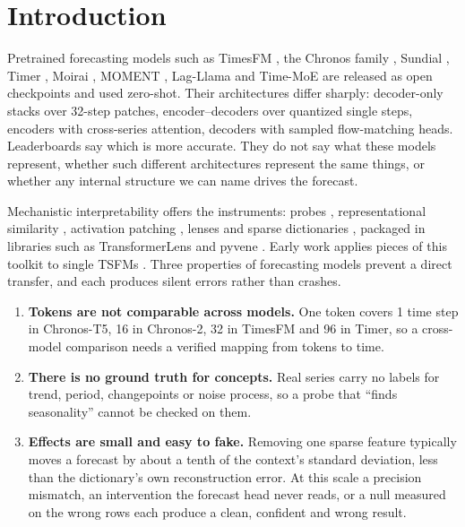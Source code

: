 \section{Introduction}
\label{sec:intro}

Pretrained forecasting models such as TimesFM \citep{das2024timesfm}, the Chronos family
\citep{ansari2024chronos,ansari2025chronos2}, Sundial \citep{liu2025sundial}, Timer \citep{liu2024timer}, Moirai
\citep{woo2024moirai}, MOMENT \citep{goswami2024moment}, Lag-Llama \citep{rasul2023lagllama} and Time-MoE
\citep{shi2025timemoe} are released as open checkpoints and used zero-shot. Their architectures differ sharply:
decoder-only stacks over 32-step patches, encoder--decoders over quantized single steps, encoders with cross-series
attention, decoders with sampled flow-matching heads. Leaderboards say which is more accurate. They do not say what these
models represent, whether such different architectures represent the same things, or whether any internal structure we
can name drives the forecast.

Mechanistic interpretability offers the instruments: probes \citep{alain2017probes,hewitt2019control},
representational similarity \citep{kornblith2019cka}, activation patching \citep{vig2020causal,meng2022rome,zhang2024patching},
lenses \citep{belrose2023tuned} and sparse dictionaries \citep{bricken2023monosemanticity,gao2025topk}, packaged in
libraries such as TransformerLens \citep{nanda2022transformerlens} and pyvene \citep{wu2024pyvene}. Early work applies
pieces of this toolkit to single TSFMs \citep{wilinski2025exploring,mishra2026dissecting,oublal2026timesae,divo2026zeitgeist}.
Three properties of forecasting models prevent a direct transfer, and each produces silent errors rather than crashes.
\begin{enumerate}[label=(\roman*)]
  \item \textbf{Tokens are not comparable across models.} One token covers 1 time step in Chronos-T5, 16 in Chronos-2,
    32 in TimesFM and 96 in Timer, so a cross-model comparison needs a verified mapping from tokens to time.
  \item \textbf{There is no ground truth for concepts.} Real series carry no labels for trend, period, changepoints or
    noise process, so a probe that ``finds seasonality'' cannot be checked on them.
  \item \textbf{Effects are small and easy to fake.} Removing one sparse feature typically moves a forecast by about a
    tenth of the context's standard deviation, less than the dictionary's own reconstruction error. At this scale a
    precision mismatch, an intervention the forecast head never reads, or a null measured on the wrong rows each produce
    a clean, confident and wrong result.
\end{enumerate}


